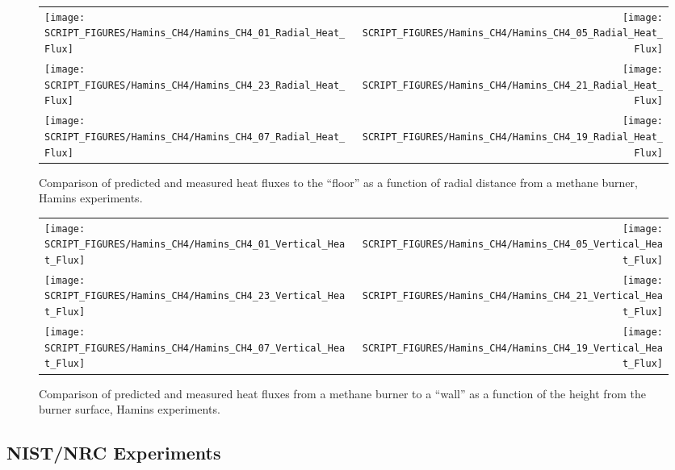 \newpage

\begin{figure}[p]
\begin{tabular*}{\textwidth}{l@{\extracolsep{\fill}}r}
\texttt{[image: SCRIPT\_FIGURES/Hamins\_CH4/Hamins\_CH4\_01\_Radial\_Heat\_Flux]} &
\texttt{[image: SCRIPT\_FIGURES/Hamins\_CH4/Hamins\_CH4\_05\_Radial\_Heat\_Flux]} \\
\texttt{[image: SCRIPT\_FIGURES/Hamins\_CH4/Hamins\_CH4\_23\_Radial\_Heat\_Flux]} &
\texttt{[image: SCRIPT\_FIGURES/Hamins\_CH4/Hamins\_CH4\_21\_Radial\_Heat\_Flux]} \\
\texttt{[image: SCRIPT\_FIGURES/Hamins\_CH4/Hamins\_CH4\_07\_Radial\_Heat\_Flux]} &
\texttt{[image: SCRIPT\_FIGURES/Hamins\_CH4/Hamins\_CH4\_19\_Radial\_Heat\_Flux]}
\end{tabular*}
\label{Hamins_CH4_Radial}
\caption[Radial heat flux predictions, Hamins methane burner experiments.]
{Comparison of predicted and measured heat fluxes to the ``floor'' as a function of radial distance from a methane burner, Hamins experiments.}
\end{figure}

\begin{figure}[p]
\begin{tabular*}{\textwidth}{l@{\extracolsep{\fill}}r}
\texttt{[image: SCRIPT\_FIGURES/Hamins\_CH4/Hamins\_CH4\_01\_Vertical\_Heat\_Flux]} &
\texttt{[image: SCRIPT\_FIGURES/Hamins\_CH4/Hamins\_CH4\_05\_Vertical\_Heat\_Flux]} \\
\texttt{[image: SCRIPT\_FIGURES/Hamins\_CH4/Hamins\_CH4\_23\_Vertical\_Heat\_Flux]} &
\texttt{[image: SCRIPT\_FIGURES/Hamins\_CH4/Hamins\_CH4\_21\_Vertical\_Heat\_Flux]} \\
\texttt{[image: SCRIPT\_FIGURES/Hamins\_CH4/Hamins\_CH4\_07\_Vertical\_Heat\_Flux]} &
\texttt{[image: SCRIPT\_FIGURES/Hamins\_CH4/Hamins\_CH4\_19\_Vertical\_Heat\_Flux]}
\end{tabular*}
\label{Hamins_CH4_Vertical}
\caption[Vertical heat flux predictions, Hamins methane burner experiments.]
{Comparison of predicted and measured heat fluxes from a methane burner to a ``wall'' as a function of the height from the burner surface, Hamins experiments.}
\end{figure}



\clearpage


\subsection{NIST/NRC Experiments}

